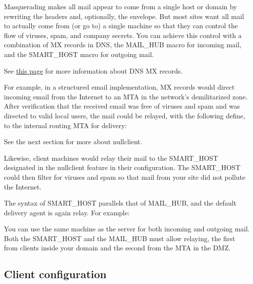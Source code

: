 Masquerading makes all mail {appear} to come from a single host or
domain by rewriting the headers and, optionally, the envelope. But most
sites want all mail to {actually} come from (or go to) a single machine
so that they can control the flow of viruses, spam, and company secrets.
You can achieve this control with a combination of
\protect\hypertarget{part0026_split_034.htmlux5cux23_idIndexMarker2535}{}{}MX
records in DNS, the {MAIL\_HUB} macro for incoming mail, and the
{SMART\_HOST} macro for outgoing mail.

\leavevmode\hypertarget{part0026_split_034.htmlux5cux23_idContainer1147}{}%
See
\protect\hyperlink{part0024_split_027.htmlux5cux23_idTextAnchor882}{this
page} for more information about DNS MX records.

For example, in a structured email implementation, MX records would
direct incoming email from the Internet to an MTA in the network's
demilitarized zone. After verification that the received email was free
of viruses and spam and was directed to valid local users, the mail
could be relayed, with the following {define}, to the internal routing
MTA for delivery:


\leavevmode\hypertarget{part0026_split_034.htmlux5cux23_idContainer1149}{}%
See the next section for more about {nullclient}.

Likewise, client machines would relay their mail to the {SMART\_HOST}
designated in the {nullclient} feature in their configuration. The
{SMART\_HOST} could then filter for viruses and spam so that mail from
your site did not pollute the Internet.

The syntax of {SMART\_HOST} parallels that of {MAIL\_HUB}, and the
default delivery agent is again {relay}. For example:


You can use the same machine as the server for both incoming and
outgoing mail. Both the {SMART\_HOST} and the {MAIL\_HUB} must allow
relaying, the first from clients inside your domain and the second from
the MTA in the DMZ.

\protect\hypertarget{part0026_split_035.html}{}{}

\hypertarget{part0026_split_035.htmlux5cux23_idContainer1247}{}
\hypertarget{part0026_split_035.htmlux5cux23calibre_pb_34}{%
\subsection[Client
configuration]{\texorpdfstring{\protect\hypertarget{part0026_split_035.htmlux5cux23_idTextAnchor1085}{}{}Client
configuration}{Client configuration}}\label{part0026_split_035.htmlux5cux23calibre_pb_34}}

